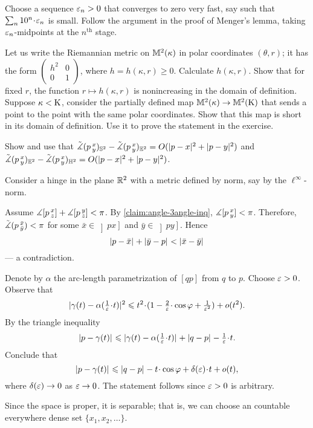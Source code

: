 Choose a sequence $\eps_n>0$ that converges to zero very fast, say such that $\sum_n10^n\cdot \eps_n$ is small.
Follow the argument in the proof of Menger's lemma, taking $\eps_n$-midpoints at the $n^{\text{th}}$ stage.

Let us write the Riemannian metric on $\MM^2(\kappa)$ in polar coordinates $(\theta,r)$;
it has the form 
$(\begin{smallmatrix}
h^2&0
\\
0&1
\end{smallmatrix})$, where $h=h(\kappa,r)\ge 0$.
Calculate $h(\kappa,r)$.
Show that for fixed $r$, the function $r\mapsto h(\kappa,r)$ is nonincreasing in the domain of definition.
Suppose $\kappa<\Kappa$, consider the partially defined map $\MM^2(\kappa)\to\MM^2(\Kappa)$ that sends a point to the point with the same polar coordinates.
Show that this map is short in its domain of definition.
Use it to prove the statement in the exercise.


 Show and use that 
$\angk p{x}{y}_{\SSS^2}-\angk p{x}{y}_{\EE^2}=O(\dist[2]{p}{x}{}+\dist[2]{p}{y}{})$
and 
$\angk p{x}{y}_{\EE^2}-\angk p{x}{y}_{\HH^2}=O(\dist[2]{p}{x}{}+\dist[2]{p}{y}{})$.

Consider a hinge in the plane $\RR^2$ with a metric defined by norm, say by the $\ell^\infty$-norm.

Assume $\mangle\hinge pxz+\mangle\hinge pyz<\pi$.
By \ref{claim:angle-3angle-inq}, $\mangle\hinge pxy<\pi$.
Therefore,
$\angk p{\bar x}{\bar y}<\pi$
for some $\bar x\in \left]px\right]$ and $\bar y\in \left]py\right]$.
Hence 
\[\dist p{\bar x}{}+\dist {\bar y}p{}<\dist {\bar x}{\bar y}{}\]
--- a contradiction.

Denote by $\alpha$ the arc-length parametrization of $[qp]$ from $q$ to $p$.
Choose $\eps>0$.
Observe that 
\[\dist[2]{\gamma(t)}{\alpha(\tfrac1\eps\cdot t)}{}\le t^2\cdot(1-\tfrac2\eps\cdot\cos\phi+\tfrac1{\eps^2})+o(t^2).\]
By the triangle  inequality
\[\dist{p}{\gamma(t)}{}\le \dist{\gamma(t)}{\alpha(\tfrac1\eps\cdot t)}{}+\dist{q}{p}{}-\tfrac1\eps\cdot t.\]
Conclude that
\[\dist{p}{\gamma(t)}{}
\le
\dist{q}{p}{}-t\cdot \cos \phi+\delta(\eps)\cdot t+o(t),\]
where $\delta(\eps)\to 0$ as $\eps\to0$.
The statement follows since $\eps>0$ is arbitrary.

Since the space is proper, it is separable; 
that is, we can choose an countable everywhere dense set $\{x_1,x_2,\dots\}$.

